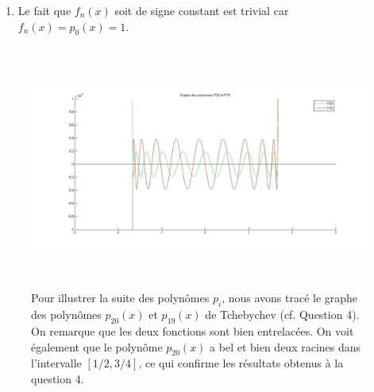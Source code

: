 \begin{enumerate}
\begin{proof}
      Comme les racines sont entrelacées, dans l'intervalle $]-\infty; \xi[$,
      il y a le même nombre de racines de $f_0$ que de racines de $f_1$.
      Ils ont donc changé de signe le même nombre de fois.
      Ils sont dès lors toujours de signe différent comme en $-\infty$.
    \end{proof}

    Soit $\epsilon > 0$ tel que
    $f_1(x), f_0'(x) \neq 0$ $\forall x \in [\xi - \epsilon, \xi]$.
    On sait que $f_0'(\xi)f_0(\xi - \epsilon) < 0$.
    En effet, soit $q(x)$ tel que $q(\xi) \neq 0$ et
    $f_0(x) = (x - \xi) q(x)$.
    Comme $f_0(x) \neq 0$
    $\forall x \in [\xi-\epsilon;\xi[$, on a aussi
    $q(x) \neq 0$ $\forall x \in [\xi - \epsilon;\xi]$.
    On a $f_0'(x) = q(x) + (x - \xi) q'(x)$ d'où
    $f_0(\xi - \epsilon) = -\epsilon q(\xi - \epsilon)$ et
    $f_0'(\xi) = q(\xi)$.
    Comme $q$ est un polynôme, il est continu donc,
    comme il n'y a pas de racine entre $\xi - \epsilon$ et $\xi$,
    $q(\xi - \epsilon)$ et $q(\xi)$ sont de même signe.
    Du même raisonnement, $f_1(\xi - \epsilon)$ et $f_1(\xi)$ sont
    de même signe.
    Comme $\epsilon > 0$, on sait alors que
    $f_0'(\xi)$ et $f_0(\xi - \epsilon)$ sont de signe opposé.
    Comme on savait que $f_0(\xi - \epsilon)$ et $f_1(\xi - \epsilon)$ étati
    de signe opposé, on a bien $f_0'(\xi) f_1(\xi) > 0$.
  \item Le fait que $f_n(x)$ soit de signe constant est trivial car
    $f_n(x) = p_0(x) = 1$.
\end{enumerate}

\begin{figure}
  \centering
  \includegraphics[height=8cm]{fig3.jpg}
  \caption{Pour illustrer la suite des polynômes $p_i$,
  nous avons tracé le graphe des polynômes $p_{20}(x)$ et $p_{19}(x)$ de
  Tchebychev (cf. Question 4).
  On remarque que les deux fonctions sont bien entrelacées.
  On voit également que le polynôme $p_{20}(x)$ a bel et bien deux racines dans
  l'intervalle $[1/2, 3/4]$,
  ce qui confirme les résultats obtenus à la question 4.}
  \label{figure_Tcheb}
\end{figure}
